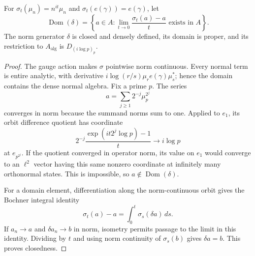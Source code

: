 \begin{proposition}
\label{v4-arith:obs:CM-stricter-than-H-arith}
For \(\sigma_t(\mu_n)=n^{it}\mu_n\) and
\(\sigma_t(e(\gamma))=e(\gamma)\), let
\[
 \operatorname{Dom}(\delta)=
 \left\{a\in A:\lim_{t\to0}\frac{\sigma_t(a)-a}{t}
                    \text{ exists in }A\right\}.
\]
The norm generator \(\delta\) is closed and densely defined, its
domain is proper, and its restriction to \(A_{\mathrm{alg}}\) is
\(D_{(i\log p)_p}\).
\end{proposition}
\begin{proof}
The gauge action makes \(\sigma\) pointwise norm continuous.
Every normal term is entire analytic, with derivative
\(i\log(r/s)\mu_r e(\gamma)\mu_s^*\); hence the domain contains
the dense normal algebra. Fix a prime \(p\). The series
\[
 a=\sum_{j\ge1}2^{-j}\mu_p^{2^j}
\]
converges in norm because the summand norms sum to one. Applied
to \(e_1\), its orbit difference quotient has coordinate
\[
 2^{-j}\frac{\exp(it2^j\log p)-1}{t}
 \longrightarrow i\log p
\]
at \(e_{p^{2^j}}\). If the quotient converged in operator norm,
its value on \(e_1\) would converge to an \(\ell^2\) vector having
this same nonzero coordinate at infinitely many orthonormal states.
This is impossible, so \(a\notin\operatorname{Dom}(\delta)\).

For a domain element, differentiation along the norm-continuous
orbit gives the Bochner integral identity
\[
 \sigma_t(a)-a=\int_0^t\sigma_s(\delta a)\,ds.
\]
If \(a_n\to a\) and \(\delta a_n\to b\) in norm, isometry permits
passage to the limit in this identity. Dividing by \(t\) and using
norm continuity of \(\sigma_s(b)\) gives \(\delta a=b\).
This proves closedness.
\end{proof}

